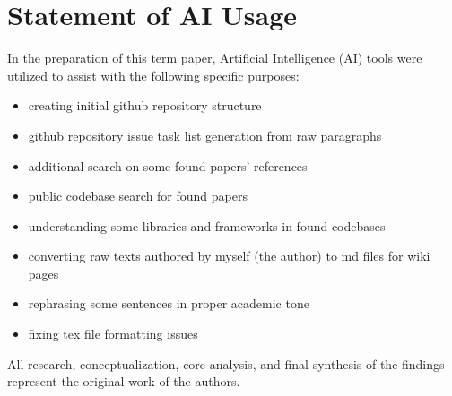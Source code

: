\documentclass[a4paper,oneside,12pt]{report}
\begin{document}
\section{Statement of AI Usage}
In the preparation of this term paper, Artificial Intelligence (AI) tools were utilized to assist with the following specific purposes:
\begin{itemize}
    \item creating initial github repository structure
    \item github repository issue task list generation from raw paragraphs
    \item additional search on some found papers' references
    \item public codebase search for found papers
    \item understanding some libraries and frameworks in found codebases
    \item converting raw texts authored by myself (the author) to md files for wiki pages
    \item rephrasing some sentences in proper academic tone
    \item fixing tex file formatting issues
\end{itemize}
All research, conceptualization, core analysis, and final synthesis of the findings represent the original work of the authors.



\end{document}
